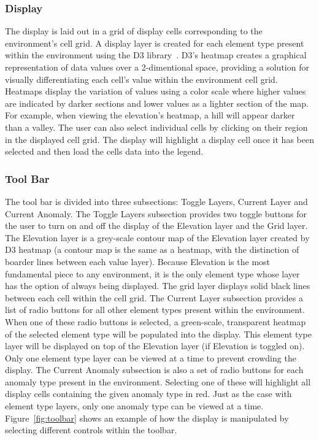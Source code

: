 \subsubsection{Display}
The display is laid out in a grid of display cells corresponding to the environment's cell grid.
A display layer is created for each element type present within the environment using the D3 library~\cite{d3}.
D3's heatmap creates a graphical representation of data values over a 2-dimentional space, providing a solution for visually differentiating each cell's value within the environment cell grid.
Heatmaps display the variation of values using a color scale where higher values are indicated by darker sections and lower values as a lighter section of the map.
For example, when viewing the elevation's heatmap, a hill will appear darker than a valley.
The user can also select individual cells by clicking on their region in the displayed cell grid.
The display will highlight a display cell once it has been selected and then load the cells data into the legend.


\subsubsection{Tool Bar}
The tool bar is divided into three subsections: Toggle Layers, Current Layer and Current Anomaly.
The Toggle Layers subsection provides two toggle buttons for the user to turn on and off the display of the Elevation layer and the Grid layer.
The Elevation layer is a grey-scale contour map of the Elevation layer created by D3 heatmap (a contour map is the same as a heatmap, with the distinction of boarder lines between each value layer).
Because Elevation is the most fundamental piece to any environment, it is the only element type whose layer has the option of always being displayed.
The grid layer displays solid black lines between each cell within the cell grid.
The Current Layer subsection provides a list of radio buttons for all other element types present within the environment.
When one of these radio buttons is selected, a green-scale, transparent heatmap of the selected element type will be populated into the display.
This element type layer will be displayed on top of the Elevation layer (if Elevation is toggled on).
Only one element type layer can be viewed at a time to prevent crowding the display.
The Current Anomaly subsection is also a set of radio buttons for each anomaly type present in the environment.
Selecting one of these will highlight all display cells containing the given anomaly type in red.
Just as the case with element type layers, only one anomaly type can be viewed at a time.
Figure~\ref{fig:toolbar} shows an example of how the display is manipulated by selecting different controls within the toolbar.

